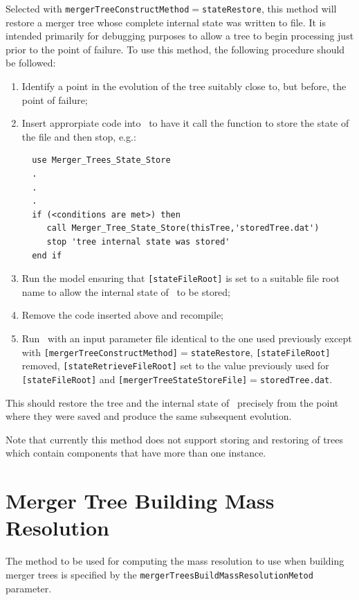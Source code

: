 Selected with {\tt mergerTreeConstructMethod}$=${\tt stateRestore}, this method will restore a merger tree whose complete internal state was written to file. It is intended primarily for debugging purposes to allow a tree to begin processing just prior to the point of failure. To use this method, the following procedure should be followed:
\begin{enumerate}
 \item Identify a point in the evolution of the tree suitably close to, but before, the point of failure;
 \item Insert approrpiate code into \glc\ to have it call the function to store the state of the file and then stop, e.g.:
 \begin{verbatim}
  use Merger_Trees_State_Store
  .
  .
  .
  if (<conditions are met>) then
     call Merger_Tree_State_Store(thisTree,'storedTree.dat')
     stop 'tree internal state was stored'
  end if
 \end{verbatim}
 \item Run the model ensuring that {\tt [stateFileRoot]} is set to a suitable file root name to allow the internal state of \glc\ to be stored;
 \item Remove the code inserted above and recompile;
 \item Run \glc\ with an input parameter file identical to the one used previously except with {\tt [mergerTreeConstructMethod]}$=${\tt stateRestore}, {\tt [stateFileRoot]} removed, {\tt [stateRetrieveFileRoot]} set to the value previously used for {\tt [stateFileRoot]} and {\tt [mergerTreeStateStoreFile]}$=${\tt storedTree.dat}.
\end{enumerate}
This should restore the tree and the internal state of \glc\ precisely from the point where they were saved and produce the same subsequent evolution.

Note that currently this method does not support storing and restoring of trees which contain components that have more than one instance.

\section{Merger Tree Building Mass Resolution}\label{sec:MergerTreeBuildingMassResolution}

The method to be used for computing the mass resolution to use when building merger trees is specified by the {\tt mergerTreesBuildMassResolutionMetod} parameter.

